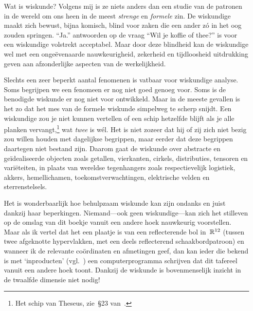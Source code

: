 \documentclass[b5paper]{book}
\begin{document}
\backmatter

\fancyfoot[CE]{}
\fancyfoot[CO]{}

\printindex

\begingroup
\renewcommand\chapter[2]{\backmattertitle{Bibliography}}
{}
\endgroup




Wat is wiskunde? Volgens mij is ze niets anders dan een studie van de patronen
in de wereld om ons heen in de meest \emph{strenge} en 
\emph{formele} zin.
De wiskundige
maakt zich  bewust, bijna komisch, blind 
voor zaken die een ander z\'o in het oog zouden springen.
``Ja.'' antwoorden op de vraag ``Wil je koffie of thee?'' is voor
een wiskundige volstrekt acceptabel.
Maar door deze blindheid kan de wiskundige wel
met een onge\"evenaarde nauwkeurigheid,
zekerheid en tijdloosheid
uitdrukking geven aan afzonderlijke  aspecten van de werkelijkheid.

Slechts een zeer beperkt aantal fenomenen
is vatbaar voor wiskundige analyse.
Soms begrijpen we een fenomeen er nog niet goed genoeg voor.
Soms is de benodigde wiskunde er nog niet voor ontwikkeld.
Maar in de meeste gevallen is het zo dat
het mes van de formele wiskunde simpelweg te scherp snijdt. 
Een wiskundige zou je niet kunnen vertellen
of een schip hetzelfde blijft als je alle planken vervangt,\footnote{Het schip
van Theseus, zie~\S23 van~\cite{theseus}.}
wat \emph{twee} is w\'el.
Het is niet zozeer dat hij of zij zich niet bezig zou willen houden
met dagelijkse begrippen, maar eerder dat deze begrippen daartegen niet
bestand zijn.
Daarom gaat de wiskunde over abstracte en ge\"idealiseerde 
objecten zoals getallen, vierkanten, cirkels, distributies,
tensoren en vari\"eteiten,
in plaats van wereldse tegenhangers zoals
respectievelijk
logistiek, akkers, hemellichamen, toekomstverwachtingen,
elektrische velden en sterrenstelsels.

Het is wonderbaarlijk hoe behulpzaam
wiskunde kan zijn ondanks en juist dankzij haar
beperkingen.
Niemand---ook geen wiskundige---kan zich het stilleven 
op de omslag van dit boekje vanuit een andere hoek nauwkeurig voorstellen.
Maar als ik vertel dat het een plaatje is van
een reflecterende bol in~$\mathbb{R}^{12}$
(tussen twee afgeknotte hypervlakken, met een deels reflecterend 
schaakbordpatroon) en wanneer ik 
de relevante co\"ordinaten en afmetingen geef, dan
kan ieder die bekend is met `inproducten' (vgl.~)
een computerprogramma schrijven dat
dit tafereel vanuit een andere hoek toont.
Dankzij de wiskunde
is bovenmenselijk inzicht in de twaalfde dimensie niet nodig!
\end{document}
